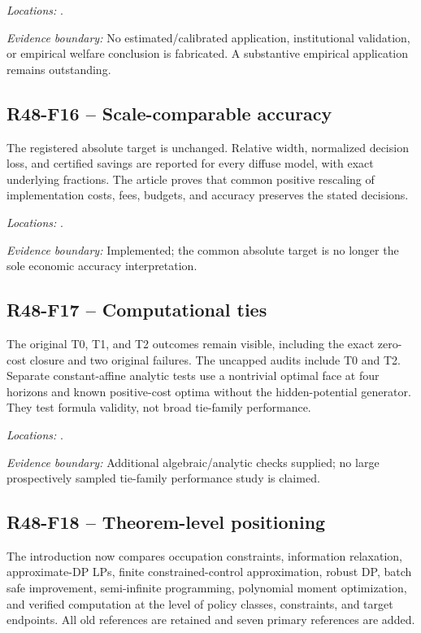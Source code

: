 \noindent\emph{Locations:} .

\noindent\emph{Evidence boundary:} No estimated/calibrated application, institutional validation, or empirical welfare conclusion is fabricated. A substantive empirical application remains outstanding.

\subsection{R48-F16 -- Scale-comparable accuracy}
The registered absolute target is unchanged. Relative width, normalized decision loss, and certified savings are reported for every diffuse model, with exact underlying fractions. The article proves that common positive rescaling of implementation costs, fees, budgets, and accuracy preserves the stated decisions.

\noindent\emph{Locations:} .

\noindent\emph{Evidence boundary:} Implemented; the common absolute target is no longer the sole economic accuracy interpretation.

\subsection{R48-F17 -- Computational ties}
The original T0, T1, and T2 outcomes remain visible, including the exact zero-cost closure and two original failures. The uncapped audits include T0 and T2. Separate constant-affine analytic tests use a nontrivial optimal face at four horizons and known positive-cost optima without the hidden-potential generator. They test formula validity, not broad tie-family performance.

\noindent\emph{Locations:} .

\noindent\emph{Evidence boundary:} Additional algebraic/analytic checks supplied; no large prospectively sampled tie-family performance study is claimed.

\subsection{R48-F18 -- Theorem-level positioning}
The introduction now compares occupation constraints, information relaxation, approximate-DP LPs, finite constrained-control approximation, robust DP, batch safe improvement, semi-infinite programming, polynomial moment optimization, and verified computation at the level of policy classes, constraints, and target endpoints. All old references are retained and seven primary references are added.

